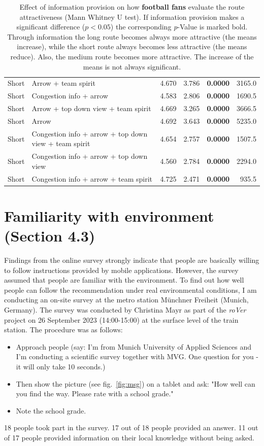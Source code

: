 \begin{table}
\begin{scriptsize}
\begin{tabular}{llrrrr}
 Short & Arrow + team spirit & 4.670 & 3.786 & \textbf{0.0000} & 3165.0 \\ 
 Short & Congestion info + arrow & 4.583 & 2.806 & \textbf{0.0000} & 1690.5 \\ 
 Short & Arrow + top down view + team spirit & 4.669 & 3.265 & \textbf{0.0000} & 3666.5 \\ 
 Short & Arrow & 4.692 & 3.643 & \textbf{0.0000} & 5235.0 \\ 
 Short & Congestion info + arrow + top down view + team spirit & 4.654 & 2.757 & \textbf{0.0000} & 1507.5 \\ 
 Short & Congestion info + arrow + top down view & 4.560 & 2.784 & \textbf{0.0000} & 2294.0 \\ 
 Short & Congestion info + arrow + team spirit & 4.725 & 2.471 & \textbf{0.0000} & 935.5 \\ 
   \hline
\end{tabular}
\end{scriptsize}
\caption{Effect of information provision on how \textbf{football fans} evaluate the route attractiveness (Mann Whitney U test). If information provision makes a significant difference ($p<0.05$) the corresponding \textit{p}-Value is marked bold. Through information the long route becomes always more attractive (the means increase), while the short route always becomes less attractive (the means reduce). Also, the medium route becomes more attractive. The increase of the means is not always significant.}
\label{tab:surveyS2D}
\end{table}



\chapter{Familiarity with environment (Section 4.3)}
\label{sec:navigation}

Findings from the online survey strongly indicate that people are basically willing to follow instructions provided by mobile applications. However, the survey assumed that people are familiar with the environment.
To find out how well people can follow the recommendation under real environmental conditions, I am conducting an on-site survey at the metro station Münchner Freiheit (Munich, Germany).
The survey was conducted by Christina Mayr as part of the \textit{roVer} project on 26 September 2023 (14:00-15:00) at the surface level of the train station. The procedure was as follows:
\begin{itemize}
\item Approach people (say: I'm from Munich University of Applied Sciences and I'm conducting a scientific survey together with MVG. One question for you - it will only take 10 seconds.)
\item Then show the picture (see fig.~\ref{fig:msg}) on a tablet and ask: "How well can you find the way. Please rate with a school grade."
\item Note the school grade.
\end{itemize}
18 people took part in the survey. 17 out of 18 people provided an answer. 11 out of 17 people provided information on their local knowledge without being asked.

